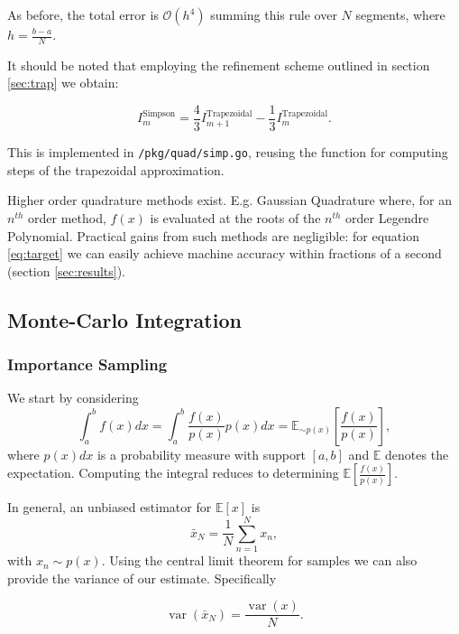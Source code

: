 \documentclass[10pt, a4paper]{article}
\begin{document}
  As before, the total error is $\mathcal{O}(h^4)$ summing this rule over $N$ segments, where
  $h = \frac{b-a}{N}$.

  It should be noted that employing the refinement scheme outlined in section \ref{sec:trap} we
  obtain\cite{nr}:

  \begin{equation}
  I_m^{\text{Simpson}} = \frac{4}{3} I_{m+1}^{\text{Trapezoidal}} - \frac{1}{3} I_m^{\text{Trapezoidal}}.
  \end{equation}

  This is implemented in \texttt{/pkg/quad/simp.go}, reusing the function for computing steps of the
  trapezoidal approximation.

  Higher order quadrature methods exist. E.g. Gaussian Quadrature where, for an $n^{th}$
  order method, $f(x)$ is evaluated at the roots of the $n^{th}$ order Legendre Polynomial\cite{gauss}.
  Practical gains from such methods are negligible: for equation \ref{eq:target} we can easily achieve
  machine accuracy within fractions of a second (section \ref{sec:results}).

\subsection{Monte-Carlo Integration}
  \subsubsection{Importance Sampling}
  \label{sec:mon-is}

  We start by considering
  \begin{equation}
  \int_a^b f(x) dx = \int_{a}^{b} \frac{f(x)}{p(x)} p(x) dx = \mathbb{E}_{\sim p(x)}\left[ \frac{f(x)}{p(x)} \right],
  \end{equation}
  where $p(x)dx$ is a probability measure with support $[a, b]$ and $\mathbb{E}$ denotes the expectation.
  Computing the integral reduces to determining $\mathbb{E}\left[ \frac{f(x)}{p(x)} \right]$.

  In general, an unbiased estimator for $\mathbb{E}\left[ x \right]$ is
  \begin{equation}
  \bar{x}_N = \frac{1}{N} \sum_{n=1}^N x_n,
  \end{equation}
  with $x_n \sim p(x)$. Using the central limit theorem for \iid{} samples we can also provide the
  variance of our estimate. Specifically

  \begin{equation}
  \label{eq:var}
  \operatorname{var}(\bar{x}_N) = \frac{\operatorname{var}(x)}{N}.
  \end{equation}
\end{document}
